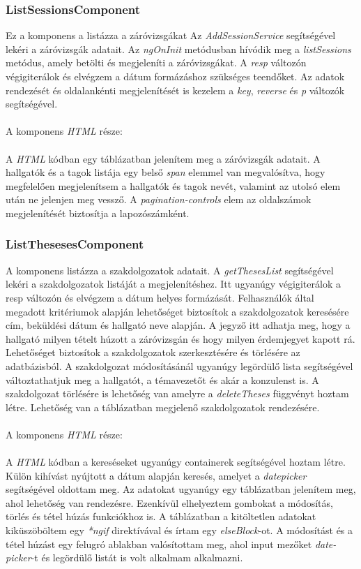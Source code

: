 \subsubsection{ListSessionsComponent}

Ez a komponens a listázza a záróvizsgákat Az \textit{AddSessionService} segítségével lekéri a záróvizsgák adatait. Az \textit{ngOnInit} metódusban hívódik meg a \textit{listSessions} metódus, amely betölti és megjeleníti a záróvizsgákat. A \textit{resp} változón végigiterálok és elvégzem a dátum formázáshoz szükséges teendőket. Az adatok rendezését és oldalankénti megjelenítését is kezelem a \textit{key}, \textit{reverse} és \textit{p} változók segítségével.\\
\\
A komponens \textit{HTML} része:\\
\\
A \textit{HTML} kódban egy táblázatban jelenítem meg a záróvizsgák adatait.  A hallgatók és a tagok listája egy belső \textit{span} elemmel van megvalósítva, hogy megfelelően megjelenítsem a hallgatók és tagok nevét, valamint az utolsó elem után ne jelenjen meg vessző. A \textit{pagination-controls} elem az oldalszámok megjelenítését biztosítja a lapozószámként.

\subsubsection{ListThesesesComponent}

A komponens listázza a szakdolgozatok adatait. A \textit{getThesesList} segítségével lekéri a szakdolgozatok listáját a megjelenítéshez. Itt ugyanúgy végigiterálok a resp változón és elvégzem a dátum helyes formázását. Felhasználók által megadott kritériumok alapján lehetőséget biztosítok a szakdolgozatok keresésére cím, beküldési dátum és hallgató neve alapján. A jegyző itt adhatja meg, hogy a hallgató milyen tételt húzott a záróvizsgán és hogy milyen érdemjegyet kapott rá. Lehetőséget biztosítok a szakdolgozatok szerkesztésére és törlésére az adatbázisból. A szakdolgozat módosításánál ugyanúgy legördülő lista segítségével változtathatjuk meg a hallgatót, a témavezetőt és akár a konzulenst is. A szakdolgozat törlésére is lehetőség van amelyre a \textit{deleteTheses} függvényt hoztam létre. Lehetőség van a táblázatban megjelenő szakdolgozatok rendezésére. \\
\\
A komponens \textit{HTML} része:\\
\\
A \textit{HTML} kódban a kereséseket ugyanúgy containerek segítségével hoztam létre.
Külön kihívást nyújtott a dátum alapján keresés, amelyet a \textit{datepicker} segítségével oldottam meg. Az adatokat ugyanúgy egy táblázatban jelenítem meg, ahol lehetőség van rendezésre. Ezenkívül elhelyeztem gombokat a módosítás, törlés és tétel húzás funkciókhoz is. A táblázatban a kitöltetlen adatokat kiküszöböltem egy \textit{*ngif} direktívával és írtam egy \textit{elseBlock}-ot. A módosítást és a tétel húzást egy felugró ablakban valósítottam meg, ahol input mezőket \textit{date-picker}-t és legördülő listát is volt alkalmam alkalmazni.


